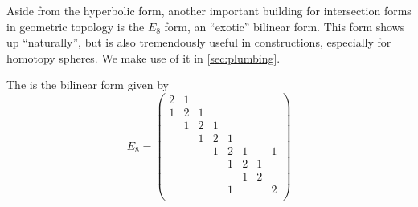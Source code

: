 Aside from the hyperbolic form, another important building for intersection forms in geometric topology is the $E_8$ form, an ``exotic'' bilinear form. This form shows up ``naturally'', but is also tremendously useful in constructions, especially for homotopy spheres. We make use of it in \cref{sec:plumbing}.

\begin{definition}
	The  is the bilinear form given by
	\[
		E_8=
		\begin{pmatrix}
			2 & 1 &   &   &   &   &   &   \\
			1 & 2 & 1 &   &   &   &   &   \\
			  & 1 & 2 & 1 &   &   &   &   \\
			  &   & 1 & 2 & 1 &   &   &   \\
			  &   &   & 1 & 2 & 1 &   & 1 \\
			  &   &   &   & 1 & 2 & 1 &   \\
			  &   &   &   &   & 1 & 2 &   \\
			  &   &   &   & 1 &   &   & 2 \\
		\end{pmatrix}
	\]
\end{definition}

